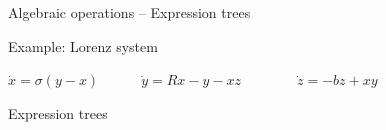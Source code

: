 \documentclass{beamer}
\begin{document}
\begin{frame}[fragile]{Algebraic operations -- Expression trees}

Example: Lorenz system

\vspace{2ex}

$ \dot{x} = \sigma( y - x ) \quad\quad\quad \dot{y} = R x - y - x z \quad\quad\quad\quad \dot{z} = - b z + x y $

\vspace{2ex}

Expression trees

\vspace{2ex}


\end{frame}
\end{document}
